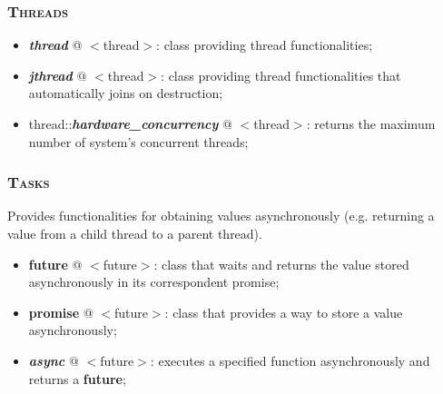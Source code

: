 \documentclass[10pt]{article}
\begin{document}
\begin{multicols*}{5}
{\subsubsection*{\textsc{Threads}}
\begin{itemize}[leftmargin=*,topsep=0.25pt]
  \setlength\itemsep{-1.8pt}
	\item  \emph{\textbf{thread}} @ $<$thread$>$: class providing thread functionalities;
	\item  \emph{\textbf{jthread}} @ $<$thread$>$: class providing thread functionalities that automatically joins on destruction;
	\item  thread::\emph{\textbf{hardware\_concurrency}} @ $<$thread$>$: returns the maximum number of system's concurrent threads;
\end{itemize}


\subsubsection*{\textsc{Tasks}}
\noindent
Provides functionalities for obtaining values asynchronously (e.g. returning a value from a child thread to a parent thread).
\begin{itemize}[leftmargin=*,topsep=0.25pt]
  \setlength\itemsep{-1.8pt}
	\item  {\textbf{future}} @ $<$future$>$: class that waits and returns the value stored asynchronously in its correspondent promise;
	\item  {\textbf{promise}} @ $<$future$>$: class that provides a way to store a value asynchronously;
	\item  \emph{\textbf{async}} @ $<$future$>$: executes a specified function asynchronously and returns a \textbf{future};
\end{itemize}


}
\end{multicols*}
\end{document}
